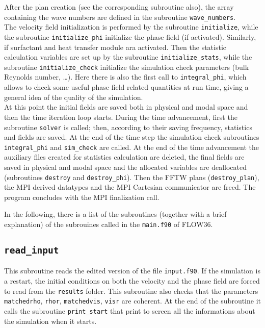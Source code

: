 After the plan creation (see the corresponding subroutine also), the array containing the wave numbers are defined in the subroutine \texttt{wave\_numbers}.\\
The velocity field initialization is performed by the subroutine \texttt{initialize}, while the subroutine \texttt{initialize\_phi} initialize the phase field (if activated). 
Similarly, if surfactant and heat transfer module ara activated.
Then the statistic calculation variables are set up by the subroutine \texttt{initialize\_stats}, while the subroutine \texttt{initialize\_check} initialize the simulation check parameters (bulk Reynolds number, \dots). Here there is also the first call to \texttt{integral\_phi}, which allows to check some useful phase field related quantities at run time, giving a general idea of the quality of the simulation.\\
At this point the initial fields are saved both in physical and modal space and then the time iteration loop starts. During the time advancement, first the subroutine \texttt{solver} is called; then, according to their saving frequency, statistics and fields are saved. At the end of the time step  the simulation check subroutines \texttt{integral\_phi} and \texttt{sim\_check} are called.
At the end of the time advancement the auxiliary files created for statistics calculation are deleted, the final fields are saved in physical and modal space and the allocated variables are deallocated (subroutines \texttt{destroy} and \texttt{destroy\_phi}). Then the FFTW plans (\texttt{destroy\_plan}), the MPI derived datatypes and the MPI Cartesian communicator are freed.
The program concludes with the MPI finalization call.

In the following, there is a list of the subroutines (together with a brief explanation) of the subrouines called in the \texttt{main.f90} of FLOW36.

\subsection{\texttt{read\_input}}
This subroutine reads the edited version of the file \texttt{input.f90}. If the simulation is a restart, the initial conditions on both the velocity and the phase field are forced to read from the \texttt{results} folder. This subroutine also checks that the parameters \texttt{matchedrho}, \texttt{rhor}, \texttt{matchedvis}, \texttt{visr} are coherent. At the end of the subroutine it calls the subroutine \texttt{print\_start} that print to screen all the informations about the simulation when it starts.

